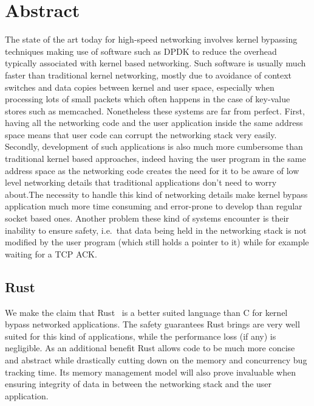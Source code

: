 \documentclass[11pt]{book}
\begin{document}
\tableofcontents
\newpage

\setcounter{page}{1}
\chapter{Abstract}

The state of the art today for high-speed networking involves kernel
bypassing techniques making use of software such as DPDK to reduce the
overhead typically associated with kernel based networking. Such
software is usually much faster than traditional kernel networking,
mostly due to avoidance of context switches and data copies between
kernel and user space, especially when processing lots of small
packets which often happens in the case of key-value stores such as
memcached. Nonetheless these systems are far from perfect. First,
having all the  networking code and the user application inside the
same address space means that user code can corrupt the networking
stack very easily. Secondly, development of such applications is also
much more cumbersome than traditional kernel based approaches, indeed
having the user program in the same address space as the networking
code creates the need for it to be aware of low level networking
details that traditional applications don't need to worry about.The
necessity to handle this kind of networking details make kernel bypass
application much more time consuming and error-prone to develop than
regular socket based ones. Another problem these kind of systems
encounter is their inability to ensure safety, i.e.\ that data being
held in the networking stack is not modified by the user program
(which still holds a pointer to it) while for example waiting for a
TCP ACK.

\section{Rust}

We make the claim that Rust~\cite{rustbook} is a better suited
language than C for kernel bypass networked applications. The safety
guarantees Rust brings are very well suited for this kind of
applications, while the performance loss (if any) is negligible. As an
additional benefit Rust allows code to be much more concise and
abstract while drastically cutting down on the memory and concurrency
bug tracking time. Its memory management model will also prove
invaluable when ensuring integrity of data in between the networking
stack and the user application.
\end{document}
